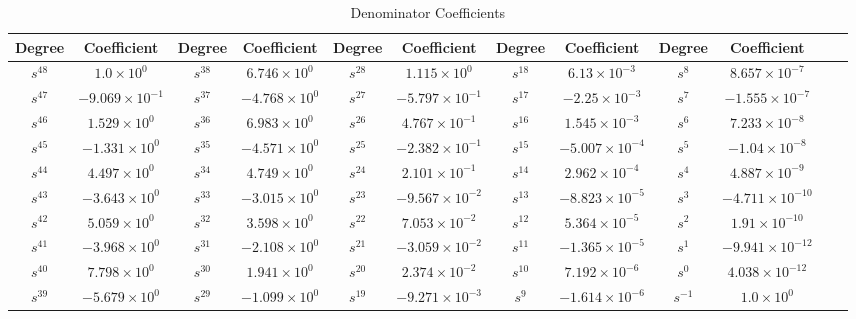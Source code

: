 \documentclass{article}
\begin{document}
\begin{table}[H]
  \centering
		\begin{adjustwidth}{-4.1cm}{}
		\caption{Denominator Coefficients}
		\begin{tabular}{|c|c|c|c|c|c|c|c|c|c|c|c|}
\hline
Degree & Coefficient & Degree & Coefficient & Degree & Coefficient & Degree & Coefficient & Degree & Coefficient\\
\hline
$s^{ 48 }$ & $ 1.0 \times 10^{ 0 }$ & $s^{ 38 }$ & $ 6.746 \times 10^{ 0 }$ & $s^{ 28 }$ & $ 1.115 \times 10^{ 0 }$  & $s^{ 18 }$ & $ 6.13 \times 10^{ -3 }$ & $s^{ 8 }$ & $ 8.657 \times 10^{ -7 }$ \\
\hline
$s^{ 47 }$ & $ -9.069 \times 10^{ -1 }$ & $s^{ 37 }$ & $ -4.768 \times 10^{ 0 }$ & $s^{ 27 }$ & $ -5.797 \times 10^{ -1 }$  & $s^{ 17 }$ & $ -2.25 \times 10^{ -3 }$ & $s^{ 7 }$ & $ -1.555 \times 10^{ -7 }$ \\
\hline
$s^{ 46 }$ & $ 1.529 \times 10^{ 0 }$ & $s^{ 36 }$ & $ 6.983 \times 10^{ 0 }$ & $s^{ 26 }$ & $ 4.767 \times 10^{ -1 }$  & $s^{ 16 }$ & $ 1.545 \times 10^{ -3 }$ & $s^{ 6 }$ & $ 7.233 \times 10^{ -8 }$ \\
\hline
$s^{ 45 }$ & $ -1.331 \times 10^{ 0 }$ & $s^{ 35 }$ & $ -4.571 \times 10^{ 0 }$ & $s^{ 25 }$ & $ -2.382 \times 10^{ -1 }$  & $s^{ 15 }$ & $ -5.007 \times 10^{ -4 }$ & $s^{ 5 }$ & $ -1.04 \times 10^{ -8 }$ \\
\hline
$s^{ 44 }$ & $ 4.497 \times 10^{ 0 }$ & $s^{ 34 }$ & $ 4.749 \times 10^{ 0 }$ & $s^{ 24 }$ & $ 2.101 \times 10^{ -1 }$  & $s^{ 14 }$ & $ 2.962 \times 10^{ -4 }$ & $s^{ 4 }$ & $ 4.887 \times 10^{ -9 }$ \\
\hline
$s^{ 43 }$ & $ -3.643 \times 10^{ 0 }$ & $s^{ 33 }$ & $ -3.015 \times 10^{ 0 }$ & $s^{ 23 }$ & $ -9.567 \times 10^{ -2 }$  & $s^{ 13 }$ & $ -8.823 \times 10^{ -5 }$ & $s^{ 3 }$ & $ -4.711 \times 10^{ -10 }$ \\
\hline
$s^{ 42 }$ & $ 5.059 \times 10^{ 0 }$ & $s^{ 32 }$ & $ 3.598 \times 10^{ 0 }$ & $s^{ 22 }$ & $ 7.053 \times 10^{ -2 }$  & $s^{ 12 }$ & $ 5.364 \times 10^{ -5 }$ & $s^{ 2 }$ & $ 1.91 \times 10^{ -10 }$ \\
\hline
$s^{ 41 }$ & $ -3.968 \times 10^{ 0 }$ & $s^{ 31 }$ & $ -2.108 \times 10^{ 0 }$ & $s^{ 21 }$ & $ -3.059 \times 10^{ -2 }$  & $s^{ 11 }$ & $ -1.365 \times 10^{ -5 }$ & $s^{ 1 }$ & $ -9.941 \times 10^{ -12 }$ \\
\hline
$s^{ 40 }$ & $ 7.798 \times 10^{ 0 }$ & $s^{ 30 }$ & $ 1.941 \times 10^{ 0 }$ & $s^{ 20 }$ & $ 2.374 \times 10^{ -2 }$  & $s^{ 10 }$ & $ 7.192 \times 10^{ -6 }$ & $s^{ 0 }$ & $ 4.038 \times 10^{ -12 }$ \\
\hline
$s^{ 39 }$ & $ -5.679 \times 10^{ 0 }$ & $s^{ 29 }$ & $ -1.099 \times 10^{ 0 }$ & $s^{ 19 }$ & $ -9.271 \times 10^{ -3 }$  & $s^{ 9 }$ & $ -1.614 \times 10^{ -6 }$ & $s^{ -1 }$ & $ 1.0 \times 10^{ 0 }$ \\
\hline

  	\end{tabular}
	\end{adjustwidth}
\end{table}
\newpage
\end{document}
